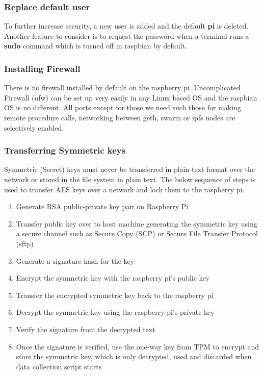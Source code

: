 \documentclass[11pt,openright]{report}
\begin{document}
\subsubsection{Replace default user}
To further increase security, a new user is added and the default \textbf{pi} is deleted. Another feature to consider is to request the password when a terminal runs a \textbf{sudo} command which is turned off in raspbian by default.

\subsubsection{Installing Firewall}
There is no firewall installed by default on the raspberry pi. Uncomplicated Firewall (ufw) can be set up very easily in any Linux based OS and the raspbian OS is no different. All ports except for those we need such those for making remote procedure calls, networking between geth, swarm or ipfs nodes are selectively enabled.

\subsubsection{Transferring Symmetric keys} \label{transfer_symm_keys}
Symmetric (Secret) keys must never be transferred in plain-text format over the network or stored in the file system in plain text. The below sequence of steps is used to transfer AES keys over a network and lock them to the raspberry pi.

\begin{enumerate}
    \item Generate RSA public-private key pair on Raspberry Pi
    \item Transfer public key over to host machine generating the symmetric key using a secure channel such as Secure Copy (SCP) or Secure File Transfer Protocol (sftp)
    \item Generate a signature hash for the key
    \item Encrypt the symmetric key with the raspberry pi's public key
    \item Transfer the encrypted symmetric key back to the raspberry pi
    \item Decrypt the symmetric key using the raspberry pi's private key
    \item Verify the signature from the decrypted text
    \item Once the signature is verified, use the one-way key from TPM to encrypt and store the symmetric key, which is only decrypted, used and discarded when data collection script starts
\end{enumerate}
\end{document}
